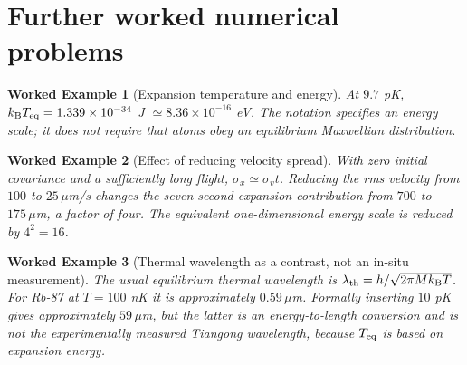 \documentclass[11pt,a4paper]{article}
\newtheorem{example}{Worked Example}
\newcommand{\kb}{k_{\mathrm B}}
\begin{document}
\section{Further worked numerical problems}
\begin{example}[Expansion temperature and energy]
At $9.7$ pK, $\kb T_{\rm eq}=1.339\times10^{-34}$ J $\simeq8.36\times10^{-16}$ eV. The notation specifies an energy scale; it does not require that atoms obey an equilibrium Maxwellian distribution.
\end{example}

\begin{example}[Effect of reducing velocity spread]
With zero initial covariance and a sufficiently long flight, $\sigma_x\simeq\sigma_vt$. Reducing the rms velocity from $100$ to $25\,\mu$m/s changes the seven-second expansion contribution from $700$ to $175\,\mu$m, a factor of four. The equivalent one-dimensional energy scale is reduced by $4^2=16$.
\end{example}

\begin{example}[Thermal wavelength as a contrast, not an in-situ measurement]
The usual equilibrium thermal wavelength is $\lambda_{\rm th}=h/\sqrt{2\pi M\kb T}$. For Rb-87 at $T=100$ nK it is approximately $0.59\,\mu$m. Formally inserting $10$ pK gives approximately $59\,\mu$m, but the latter is an energy-to-length conversion and is \emph{not} the experimentally measured Tiangong wavelength, because $T_{\rm eq}$ is based on expansion energy.
\end{example}
\end{document}
